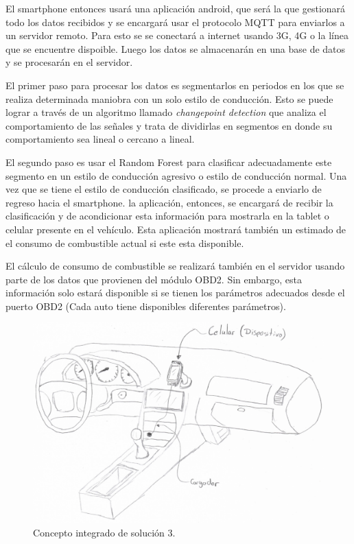 El smartphone entonces usará una aplicación android, que será la que gestionará todo los datos recibidos y se encargará usar el protocolo MQTT para enviarlos a un servidor remoto. Para esto se se conectará a internet usando 3G, 4G o la línea que se encuentre dispoible. Luego los datos se almacenarán en una base de datos y se procesarán en el servidor.

El primer paso para procesar los datos es segmentarlos en periodos en los que se realiza determinada maniobra con un solo estilo de conducción. Esto se puede lograr a través de un algoritmo llamado {\it changepoint detection} que analiza el comportamiento de las señales y trata de dividirlas en segmentos en donde su comportamiento sea lineal o cercano a lineal.

El segundo paso es usar el Random Forest para clasificar adecuadamente este segmento en un estilo de conducción agresivo o estilo de conducción normal. Una vez que se tiene el estilo de conducción clasificado, se procede a enviarlo de regreso hacia el smartphone. la aplicación, entonces,  se encargará de recibir la clasificación y de acondicionar esta información para mostrarla en la tablet o celular presente en el vehículo. Esta aplicación mostrará también un estimado de el consumo de combustible actual si este esta disponible.

El cálculo de consumo de combustible se realizará también en el servidor usando parte de los datos que provienen del módulo OBD2. Sin embargo,  esta información solo estará disponible si se tienen los parámetros adecuados desde el puerto OBD2 (Cada auto tiene disponibles diferentes parámetros).

\begin{figure}[htb!]
\centering
\includegraphics[width=\textwidth]{Dibujo_3.pdf}
\caption{Concepto integrado de solución 3.}
\label{fig:dibujo_3}
\end{figure}

